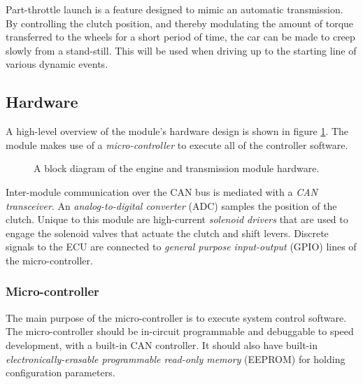 Part-throttle launch is a feature designed to mimic an automatic transmission. By controlling the clutch position, and thereby modulating the amount of torque transferred to the wheels for a short period of time, the car can be made to creep slowly from a stand-still. This will be used when driving up to the starting line of various dynamic events.

\subsection{Hardware \label{sec:design_engine_transmission_hardware}}

A high-level overview of the module's hardware design is shown in figure \ref{fig:engine_hardware_design_block}. The module makes use of a \emph{micro-controller} to execute all of the controller software. 

\vspace{1em}
\begin{figure}[H]
	\centering
	
	\caption{A block diagram of the engine and transmission module hardware.}
	\label{fig:engine_hardware_design_block}
\end{figure}


Inter-module communication over the CAN bus is mediated with a \emph{CAN transceiver}. An \emph{analog-to-digital converter} (ADC) samples the position of the clutch. Unique to this module are high-current \emph{solenoid drivers} that are used to engage the solenoid valves that actuate the clutch and shift levers. Discrete signals to the ECU are connected to \emph{general purpose input-output} (GPIO) lines of the micro-controller.

\subsubsection{Micro-controller}


The main purpose of the micro-controller is to execute system control software. The micro-controller should be in-circuit programmable and debuggable to speed development, with a built-in CAN controller. It should also have built-in \emph{electronically-erasable programmable read-only memory} (EEPROM) for holding configuration parameters.

